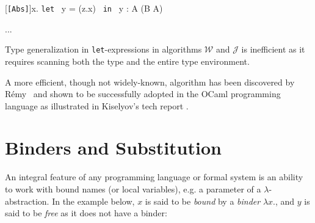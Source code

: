 \begin{prooftree*}



  [\texttt{[Abs]}]{\Gamma \vdash \lambda x. \texttt{let } y = (\lambda z.x) \texttt{ in } y : A \to (B \to A)}
\end{prooftree*}

...

Type generalization in \texttt{let}-expressions in algorithms $\mathcal{W}$ and $\mathcal{J}$ is inefficient as it requires scanning both the type and the entire type environment.

A more efficient, though not widely-known, algorithm has been discovered by R\'emy~\cite{Remy1992_SortedEqTheoryTypes} and shown to be successfully adopted in the OCaml programming language as illustrated in Kiselyov's tech report \cite{Kiselyov2022_OCamplTypeChecker}.

\section{Binders and Substitution}

An integral feature of any programming language or formal system is an ability to work with bound names (or local variables), e.g. a parameter of a $\lambda$-abstraction. In the example below, $x$ is said to be \textit{bound} by a \textit{binder} $\lambda x.$, and $y$ is said to be \textit{free} as it does not have a binder:

